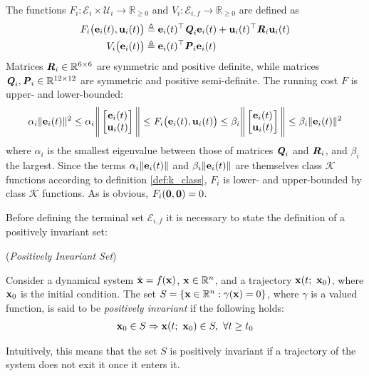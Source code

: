 


The functions
$F_i : \mathcal{E}_i \times \mathcal{U}_i \to \mathbb{R}_{\geq 0}$ and
$V_i: \mathcal{E}_{i,f} \to \mathbb{R}_{\geq 0}$ are defined as
\begin{align}
  F_i \big(\bm{\mathbf{e}}_i(t), \bm{\mathbf{u}}_i(t)\big)
  &\triangleq \bm{\mathbf{e}}_i(t)^{\top} \bm{\mathit{Q}}_i \bm{\mathbf{e}}_i(t) + \bm{\mathbf{u}}_i(t)^{\top} \bm{\mathit{R}}_i \bm{\mathbf{u}}_i(t)\\
  V_i \big(\bm{\mathbf{e}}_i(t)\big) & \triangleq \bm{\mathbf{e}}_i(t)^{\top} \bm{\mathit{P}}_i \bm{\mathbf{e}}_i(t)
\end{align}
Matrices $\bm{\mathit{R}}_i \in \mathbb{R}^{6 \times 6}$ are symmetric and positive
definite, while matrices $\bm{\mathit{Q}}_i, \bm{\mathit{P}}_i \in \mathbb{R}^{12 \times 12}$
are symmetric and positive semi-definite. The running cost $F$ is
upper- and lower-bounded:
\begin{align}
  \alpha_i \|\bm{\mathbf{e}}_i(t)\|^2 \leq
  \alpha_i \Bigg\| \begin{bmatrix}
      \bm{\mathbf{e}}_i(t) \\
      \bm{\mathbf{u}}_i(t)
    \end{bmatrix}\Bigg\| \leq
  F_i \big(\bm{\mathbf{e}}_i(t), \bm{\mathbf{u}}_i(t)\big) \leq
  \beta_i \Bigg\| \begin{bmatrix}
      \bm{\mathbf{e}}_i(t) \\
      \bm{\mathbf{u}}_i(t)
    \end{bmatrix}\Bigg\| \leq
  \beta_i \|\bm{\mathbf{e}}_i(t)\|^2
\end{align}
where $\alpha_i$ is the smallest eigenvalue between those of matrices
$\bm{\mathit{Q}}_i$ and $\bm{\mathit{R}}_i$, and $\beta_i$ the largest. Since the terms
$\alpha_i \|\bm{\mathbf{e}}_i(t)\|$ and $\beta_i \|\bm{\mathbf{e}}_i(t)\|$ are themselves
class $\mathcal{K}$ functions according to definition \eqref{def:k_class},
$F_i$ is lower- and upper-bounded by class $\mathcal{K}$ functions. As is
obvious, $F_i(\bm{\mathbf{0}}, \bm{\mathbf{0}}) = 0$.


Before defining the terminal set
$\mathcal{E}_{i,f}$ it is necessary to state the definition of a positively
invariant set:

\begin{bw_box}
  \begin{definition} (\textit{Positively Invariant Set})

    Consider a dynamical system $\dot{\bm{\mathbf{x}}} = f(\bm{\mathbf{x}})$,
    $\bm{\mathbf{x}} \in \mathbb{R}^n$, and a trajectory $\bm{\mathbf{x}}(t;\ \bm{\mathbf{x}}_0)$,
    where $\bm{\mathbf{x}}_0$ is the initial condition. The set
    $S = \{\bm{\mathbf{x}} \in \mathbb{R}^n : \gamma(\bm{\mathbf{x}}) = 0\}$, where
    $\gamma$ is a valued function, is said to be \textit{positively invariant}
    if the following holds:
    \begin{align}
      \vect{x}_0 \in S \Rightarrow \vect{x}(t;\ \vect{x}_0) \in S,\ \forall t \geq t_0
    \end{align}

    Intuitively, this means that the set $S$ is positively invariant if a
    trajectory of the system does not exit it once it enters it.
    \label{def:positively_invariant}
  \end{definition}
\end{bw_box}

